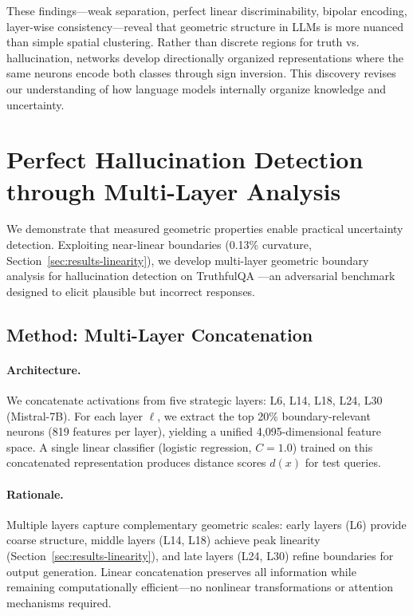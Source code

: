 \documentclass[11pt]{article}
\begin{document}
These findings---weak separation, perfect linear discriminability, bipolar encoding, layer-wise consistency---reveal that geometric structure in LLMs is more nuanced than simple spatial clustering. Rather than discrete regions for truth vs. hallucination, networks develop directionally organized representations where the same neurons encode both classes through sign inversion. This discovery revises our understanding of how language models internally organize knowledge and uncertainty.\section{Perfect Hallucination Detection through Multi-Layer Analysis}

\label{sec:application}

We demonstrate that measured geometric properties enable practical uncertainty detection. Exploiting near-linear boundaries (0.13\% curvature, Section~\ref{sec:results-linearity}), we develop multi-layer geometric boundary analysis for hallucination detection on TruthfulQA \citep{lin2022truthfulqa}---an adversarial benchmark designed to elicit plausible but incorrect responses.

\subsection{Method: Multi-Layer Concatenation}

\paragraph{Architecture.} We concatenate activations from five strategic layers: L6, L14, L18, L24, L30 (Mistral-7B). For each layer $\ell$, we extract the top 20\% boundary-relevant neurons (819 features per layer), yielding a unified 4,095-dimensional feature space. A single linear classifier (logistic regression, $C=1.0$) trained on this concatenated representation produces distance scores $d(x)$ for test queries.

\paragraph{Rationale.} Multiple layers capture complementary geometric scales: early layers (L6) provide coarse structure, middle layers (L14, L18) achieve peak linearity (Section~\ref{sec:results-linearity}), and late layers (L24, L30) refine boundaries for output generation. Linear concatenation preserves all information while remaining computationally efficient---no nonlinear transformations or attention mechanisms required.
\end{document}
